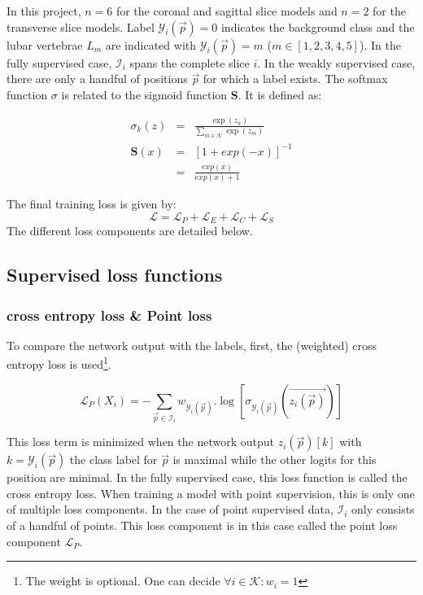 \par{
    In this project, $n=6$ for the coronal and sagittal slice models and $n=2$ for the transverse slice models. 
    Label $\mathcal{Y}_i(\vec{p})=0$ indicates the background class and the lubar vertebrae $L_m$ are indicated with $\mathcal{Y}_i(\vec{p})=m$ ($m\in[1,2,3,4,5]$).
    In the fully supervised case, $\mathcal{I}_i$ spans the complete slice $i$. In the weakly supervised case, there are only a handful of positions $\vec{p}$ for which a label exists.
}
The softmax function $\sigma$ is related to the sigmoid function $\mathbf{S}$. It is defined as:

\begin{eqnarray}
    \sigma_k(z) &=& \frac{\exp(z_k)}{\sum_{m\in\mathcal{K}} \exp(z_m)} \\
    \mathbf{S}(x) &=& \left[ 1+ exp(-x) \right]^{-1} \\ &=& \frac{exp(x)}{exp(x) + 1} 
\end{eqnarray}

The final training loss is given by:
\begin{equation}
    \mathcal{L} = \mathcal{L}_P + \mathcal{L}_E + \mathcal{L}_C + \mathcal{L}_S
\end{equation}
The different loss components are detailed below.

\subsection{Supervised loss functions}

\subsubsection{cross entropy loss\label{sec:crossentropy} \& Point loss}
To compare the network output with the labels, first, the (weighted) cross entropy loss is used\footnote{The weight is optional. One can decide $\forall i\in\mathcal{K}: w_i=1$}.

\begin{equation}
\mathcal{L}_P(X_i) = -\sum_{\vec{p} \in \mathcal{I}_i} w_{\mathcal{Y}_i(\vec{p})}.\log\left[\sigma_{\mathcal{Y}_i(\vec{p})}\left(\vec{z_i(\vec{p})}\right)\right]
\label{eq:LP}
\end{equation}

This loss term is minimized when the network output $z_i(\vec{p})[k]$ with $k=\mathcal{Y}_i(\vec{p})$ the class label for $\vec{p}$ is maximal while the other logits for this position are minimal.
In the fully supervised case, this loss function is called the cross entropy loss. 
When training a model with point supervision, this is only one of multiple loss components. 
In the case of point supervised data, $\mathcal{I}_i$ only consists of a handful of points.
This loss component is in this case called the point loss component $\mathcal{L}_P$.

